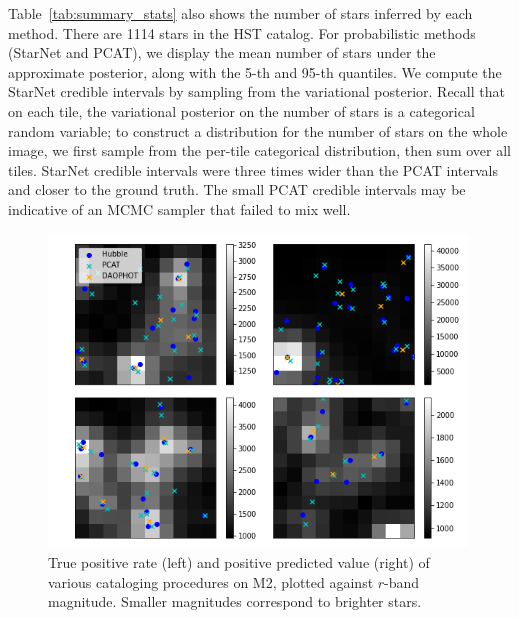 Table~\ref{tab:summary_stats} also shows the number of stars inferred by each method.
There are 1114 stars in the HST catalog.
For probabilistic methods (StarNet and PCAT),
we display the mean number of stars under the approximate posterior, along with the 5-th and 95-th quantiles.
We compute the StarNet credible intervals by sampling from the variational posterior. 
Recall that on each tile, the variational posterior on the number of stars is a categorical random variable; 
to construct a distribution for the number of stars on the whole image, we first sample from the per-tile categorical distribution, then sum over all tiles. 
StarNet credible intervals were three times wider than the PCAT intervals
and closer to the ground truth.
The small PCAT credible intervals may be indicative of an MCMC sampler that failed to mix well.





\begin{figure}[tb]
    \centering
    \includegraphics[width=0.99\textwidth]{figures/m2_results/summary_statistics_m2.png}
    \vspace{-0.4cm}
    \caption{True positive rate (left) and positive predicted value (right) of various cataloging
    procedures on M2, plotted against $r$-band magnitude.
    Smaller magnitudes correspond to brighter stars.
    }
    \label{fig:summary_stats}
\end{figure}

